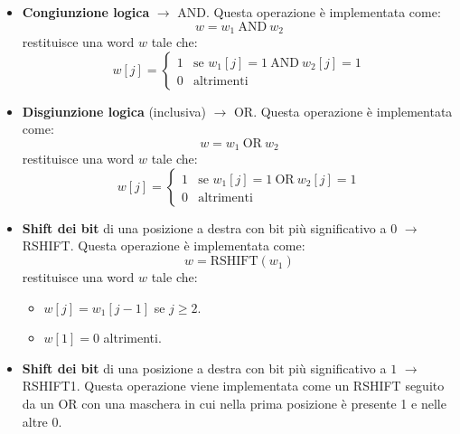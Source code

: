 \begin{itemize}
    \item \textbf{Congiunzione logica} $\to$ AND. Questa operazione è implementata
          come:
          \begin{equation}
              w = w_1 \ \text{AND} \ w_2
          \end{equation}
          restituisce una word $w$ tale che:
          \begin{equation}
              w[j] = \begin{cases}
                  1 & \text{se } w_1[j] = 1 \ \text{AND} \ w_2[j] = 1 \\
                  0 & \text{altrimenti}
              \end{cases}
          \end{equation}
    \item \textbf{Disgiunzione logica} (inclusiva) $\to$ OR. Questa operazione è
          implementata come:
          \begin{equation}
              w = w_1 \ \text{OR} \ w_2
          \end{equation}
          restituisce una word $w$ tale che:
          \begin{equation}
              w[j] = \begin{cases}
                  1 & \text{se } w_1[j] = 1 \ \text{OR} \ w_2[j] = 1 \\
                  0 & \text{altrimenti}
              \end{cases}
          \end{equation}
    \item \textbf{Shift dei bit} di una posizione a destra con bit più significativo
          a $0$ $\to$ RSHIFT. Questa operazione è implementata come:
          \begin{equation}
              w = \text{RSHIFT}(w_1)
          \end{equation}
          restituisce una word $w$ tale che:
          \begin{itemize}
              \item $w[j] = w_1[j - 1]$ se $j \geq 2$.
              \item $w[1] = 0$ altrimenti.
          \end{itemize}
    \item \textbf{Shift dei bit} di una posizione a destra con bit più significativo
          a $1$ $\to$ RSHIFT1. Questa operazione viene implementata come un RSHIFT
          seguito da un OR con una maschera in cui nella prima posizione è presente
          1 e nelle altre 0.
\end{itemize}
